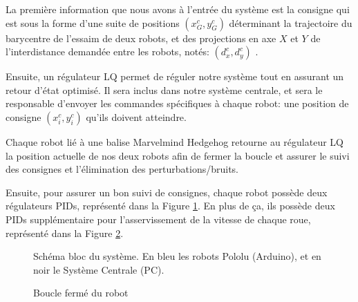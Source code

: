 La première information que nous avons à l'entrée du système est la consigne qui est sous la forme d'une suite de positions $(x^c_G,y^c_G)$ déterminant la trajectoire du barycentre de l'essaim de deux robots, et des projections en axe $X$ et $Y$ de l'interdistance demandée entre les robots, notés: $(d^c_x,d^c_y)$ .

Ensuite, un régulateur LQ permet de réguler notre système tout en assurant un retour d'état optimisé. Il sera inclus dans notre système centrale, et sera le responsable d'envoyer les commandes spécifiques à chaque robot: une position de consigne $(x^c_i,y^c_i)$ qu'ils doivent atteindre. 

Chaque robot lié à une balise Marvelmind Hedgehog retourne au régulateur LQ la position actuelle de nos deux robots afin de fermer la boucle et assurer le suivi des consignes et l'élimination des perturbations/bruits.



Ensuite, pour assurer un bon suivi de consignes, chaque robot possède deux régulateurs PIDs, représenté dans la Figure \ref{fig:robot}. En plus de ça, ils possède deux PIDs supplémentaire pour l'asservissement de la vitesse de chaque roue, représenté dans la Figure \ref{fig:robot_pid}. 

\begin{figure}[h!]
    \centering
    
    \caption{Schéma bloc du système. En bleu les robots Pololu (Arduino), et en noir le Système Centrale (PC).}
    \label{fig:robot}
\end{figure}

\begin{figure}[h!]
    \centering
    
    \caption{Boucle fermé du robot}
    \label{fig:robot_pid}
\end{figure}

\clearpage
